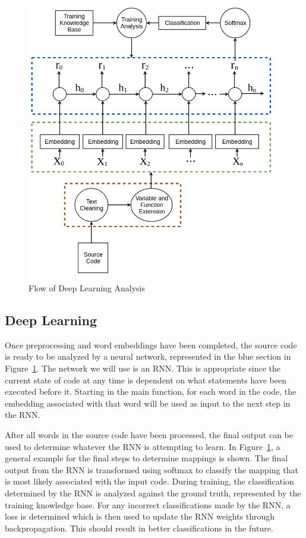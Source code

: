 \begin{figure}
   \centering
   \includegraphics[scale=.32]{figures/deeplearningflow.png}
   \caption{Flow of Deep Learning Analysis}
   \label{deeplearningflow}
\end{figure}

\subsection{Deep Learning}

Once preprocessing and word embeddings have been completed, the source code is ready to be analyzed by a neural network, represented in the blue section in Figure~\ref{deeplearningflow}. The network we will use is an RNN. This is appropriate since the current state of code at any time is dependent on what statements have been executed before it. Starting in the main function, for each word in the code, the embedding associated with that word will be used as input to the next step in the RNN.

After all words in the source code have been processed, the final output can be used to determine whatever the RNN is attempting to learn. In Figure~\ref{deeplearningflow}, a general example for the final steps to determine mappings is shown. The final output from the RNN is transformed using softmax to classify the mapping that is most likely associated with the input code. During training, the classification determined by the RNN is analyzed against the ground truth, represented by the training knowledge base. For any incorrect classifications made by the RNN, a loss is determined which is then used to update the RNN weights through backpropagation. This should result in better classifications in the future.




